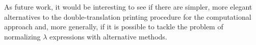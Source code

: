 \documentclass{article}
\begin{document}
As future work, it would be interesting to see if there are simpler, more elegant alternatives to the double-translation printing procedure for the computational approach and, more generally, if it is possible to tackle the problem of normalizing $\lambda$ expressions with alternative methods.

\end{document}
